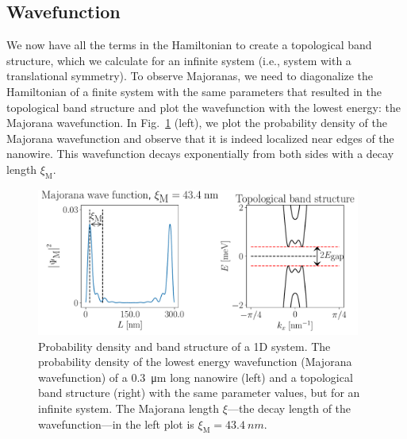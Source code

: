 \subsection{Wavefunction}
We now have all the terms in the Hamiltonian to create a topological band structure, which we calculate for an infinite system (i.e., system with a translational symmetry).
To observe Majoranas, we need to diagonalize the Hamiltonian of a finite system with the same parameters that resulted in the topological band structure and plot the wavefunction with the lowest energy: the Majorana wavefunction.
In Fig.~\ref{fig:wavefunction_1d} (left), we plot the probability density of the Majorana wavefunction and observe that it is indeed localized near edges of the nanowire.
This wavefunction decays exponentially from both sides with a decay length $\xi_\textrm{M}$.

\begin{figure}
\begin{center}
\includegraphics[width=0.95\textwidth]{chapter_introduction/figures/wf_and_band_structure.pdf}
\caption{Probability density and band structure of a 1D system.
The probability density of the lowest energy wavefunction (Majorana wavefunction) of a \SI{0.3}{\micro\metre} long nanowire (left) and a topological band structure (right) with the same parameter values, but for an infinite system.
The Majorana length $\xi$---the decay length of the wavefunction---in the left plot is $\xi_\textrm{M}=\SI{43.4}{nm}$.
\label{fig:wavefunction_1d}}
\end{center}
\end{figure}

